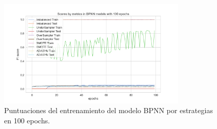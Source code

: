 \begin{figure}[h!]
	\centering
	\includegraphics[width=0.8\textwidth]{"figuras/Experimento5/BPNN/BPNN_100_train"}
	\caption{Puntuaciones del entrenamiento del modelo BPNN por estrategias en 100 epochs.}
	\label{an:50}
\end{figure}

